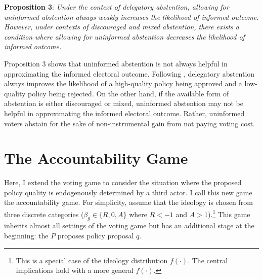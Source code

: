 \documentclass[letterpaper, 12pt]{article}
\begin{document}
    \noindent \textbf{Proposition 3}: \textit{Under the context of delegatory abstention, allowing for uninformed abstention always weakly increases the likelihood of informed outcome. However, under contexts of discouraged and mixed abstention, there exists a condition where allowing for uninformed abstention decreases the likelihood of informed outcome.}
    
    \noindent Proposition 3 shows that uninformed abstention is not always helpful in approximating the informed electoral outcome. Following \cite{Feddersen1996thsw}, delegatory abstention always improves the likelihood of a high-quality policy being approved and a low-quality policy being rejected. On the other hand, if the available form of abstention is either discouraged or mixed, uninformed abstention may not be helpful in approximating the informed electoral outcome. Rather, uninformed voters abstain for the sake of non-instrumental gain from not paying voting cost.
    
    \section*{The Accountability Game}
    
    \par Here, I extend the voting game to consider the situation where the proposed policy quality is endogenously determined by a third actor. I call this new game the accountability game. For simplicity, assume that the ideology is chosen from three discrete categories ($\beta_g \in \{R, 0, A\}$ where $R<-1$ and $A>1$).\footnote{This is a special case of the ideology distribution $f(\cdot)$. The central implications hold with a more general $f(\cdot)$.} This game inherits almost all settings of the voting game but has an additional stage at the beginning: the $P$ proposes policy proposal $q$.
    
\end{document}
